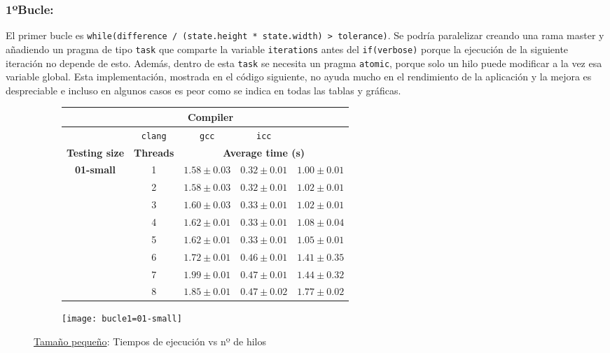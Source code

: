 
\subsubsection{\textbf{1ºBucle:}}
\par El primer bucle es \texttt{while(difference / (state.height * state.width) > tolerance)}. Se podría paralelizar creando una rama master y añadiendo un pragma de tipo
\texttt{task} que comparte la variable \texttt{iterations} antes del \texttt{if(verbose)} porque la ejecución de la siguiente iteración no depende de esto.
Además, dentro de esta \texttt{task} se necesita un pragma \texttt{atomic}, porque solo un hilo puede modificar a la vez esa variable global. Esta
implementación, mostrada en el código siguiente, no ayuda mucho en el rendimiento de la aplicación y la mejora es despreciable e incluso en 
algunos casos es peor como se indica en todas las tablas y gráficas.
\begin{figure}[H]
    \centering
    \begin{subfigure}{0.4\textwidth}
        \begin{adjustbox}{width=\textwidth} 
        \begin{tabular}{|c|c|c|c|c|}
            \hline
            \rowcolor{azul} \multicolumn{2}{|c|}{}&\multicolumn{3}{c|}{\textbf{Compiler}} \\ \hline
            \rowcolor{azul} \multicolumn{2}{|c|}{}&\texttt{clang}&\texttt{gcc}&\texttt{icc}\\ \hline
            \rowcolor{azul} \textbf{Testing size} & \textbf{Threads}&\multicolumn{3}{c|}{\textbf{Average time (s)}} \\ \hline
            \multirow{8}{1cm}{\textbf{01-small}} & 1 & \(1.58\pm{0.03}\) & \(0.32\pm{0.01}\) & \(1.00\pm{0.01}\) \\ \cline{2-5}
            & 2 & \(1.58\pm{0.03}\) & \(0.32\pm{0.01}\) & \(1.02\pm{0.01}\) \\ \cline{2-5}
            & 3 & \(1.60\pm{0.03}\) & \(0.33\pm{0.01}\) & \(1.02\pm{0.01}\) \\ \cline{2-5}
            & 4 & \(1.62\pm{0.01}\) & \(0.33\pm{0.01}\) & \(1.08\pm{0.04}\) \\ \cline{2-5}
            & 5 & \(1.62\pm{0.01}\) & \(0.33\pm{0.01}\) & \(1.05\pm{0.01}\) \\ \cline{2-5}
            & 6 & \(1.72\pm{0.01}\) & \(0.46\pm{0.01}\) & \(1.41\pm{0.35}\) \\ \cline{2-5}
            & 7 & \(1.99\pm{0.01}\) & \(0.47\pm{0.01}\) & \(1.44\pm{0.32}\) \\ \cline{2-5}
            & 8 & \(1.85\pm{0.01}\) & \(0.47\pm{0.02}\) & \(1.77\pm{0.02}\) \\ \hline
        \end{tabular}
        \end{adjustbox}
    \end{subfigure}
    \hfill
    \begin{subfigure}{0.5\textwidth}
        \texttt{[image: bucle1=01-small]}
    \end{subfigure}
    \caption{\underline{Tamaño pequeño}: Tiempos de ejecución vs nº de hilos}
    \label{fig:bucle1=01-small}
\end{figure}
